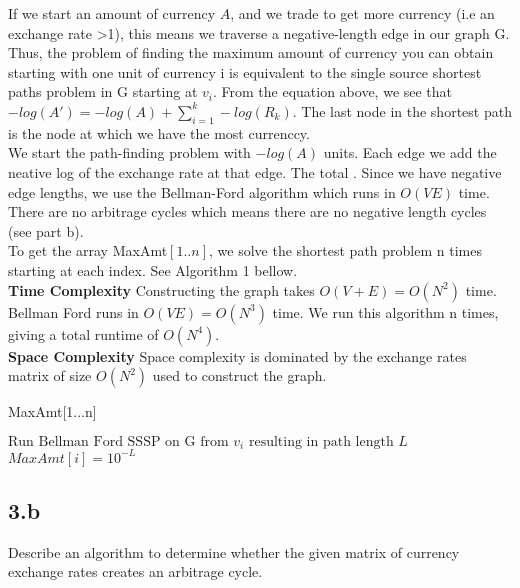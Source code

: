 \documentclass[11pt]{article}
\begin{document}
\begin{solution}
If we start an amount of currency $A$, and we trade to get more currency (i.e an exchange rate >1), this means we traverse a negative-length edge in our graph G.  Thus, the problem of finding the maximum amount of currency you can obtain starting with one unit of currency i is equivalent to the single source shortest paths problem in G starting at $v_i$. From the equation above, we see that $-log(A')=-log(A)+\sum_{i=1}^{k} -log(R_k)$. The last node in the shortest path is the node at which we have the most currenccy. \\ 

We start the path-finding problem with $-log(A)$ units. Each edge we add the neative log of the exchange rate at that edge. The total . Since we have negative edge lengths, we use the Bellman-Ford algorithm which runs in $O(VE)$ time. There are no arbitrage cycles which means there are no negative length cycles (see part b).  \\

To get the array MaxAmt$[1..n]$, we solve the shortest path problem n times starting at each index. See Algorithm 1 bellow. \\

\textbf{Time Complexity}
Constructing the graph takes $O(V+E)=O(N^2)$ time.
Bellman Ford runs in $O(VE)=O(N^3)$ time. We run this algorithm n times, giving a total runtime of $O(N^4)$. \\

\textbf{Space Complexity} 
Space complexity is dominated by the exchange rates matrix of size $O(N^2)$ used to construct the graph.

\begin{algorithm}
\caption{MaxAmt[1...n]}
\begin{algorithmic}
\STATE $\text{Run Bellman Ford SSSP on G from }v_i \text{ resulting in path length } L$
\STATE $MaxAmt[i] = 10^{-L}$
\ENDFOR
\end{algorithmic}
\end{algorithm} 


\end{solution}

\clearpage



\subsection *{3.b} Describe an algorithm to determine whether the given matrix of currency exchange rates creates an arbitrage cycle. 
\end{document}
